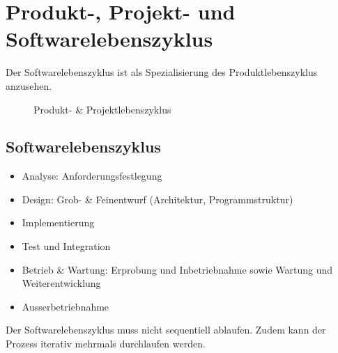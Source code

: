 \section{Produkt-, Projekt- und Softwarelebenszyklus}
Der Softwarelebenszyklus ist als Spezialisierung des Produktlebenszyklus anzusehen. 
\begin{figure}[ht]
	\centering
	\caption[]{Produkt- \& Projektlebenszyklus}
\end{figure}


\subsection{Softwarelebenszyklus}
\begin{itemize}
	\item Analyse: Anforderungsfestlegung
	\item Design: Grob- \& Feinentwurf (Architektur, Programmstruktur)
	\item Implementierung
	\item Test und Integration
	\item Betrieb \& Wartung: Erprobung und Inbetriebnahme sowie Wartung und Weiterentwicklung
	\item Ausserbetriebnahme
\end{itemize}
Der Softwarelebenszyklus muss nicht sequentiell ablaufen. Zudem kann der Prozess iterativ mehrmals durchlaufen werden. 

